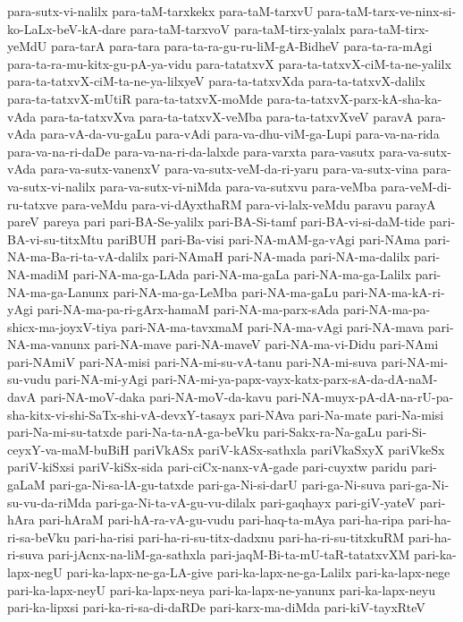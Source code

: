 {para-sutx-vi-nalilx
para-taM-tarxkekx
para-taM-tarxvU
para-taM-tarx-ve-ninx-si-ko-LaLx-beV-kA-dare
para-taM-tarxvoV
para-taM-tirx-yalalx
para-taM-tirx-yeMdU
para-tarA
para-tara
para-ta-ra-gu-ru-liM-gA-BidheV
para-ta-ra-mAgi
para-ta-ra-mu-kitx-gu-pA-ya-vidu
para-tatatxvX
para-ta-tatxvX-ciM-ta-ne-yalilx
para-ta-tatxvX-ciM-ta-ne-ya-lilxyeV
para-ta-tatxvXda
para-ta-tatxvX-dalilx
para-ta-tatxvX-mUtiR
para-ta-tatxvX-moMde
para-ta-tatxvX-parx-kA-sha-ka-vAda
para-ta-tatxvXva
para-ta-tatxvX-veMba
para-ta-tatxvXveV
paravA
para-vAda
para-vA-da-vu-gaLu
para-vAdi
para-va-dhu-viM-ga-Lupi
para-va-na-rida
para-va-na-ri-daDe
para-va-na-ri-da-lalxde
para-varxta
para-vasutx
para-va-sutx-vAda
para-va-sutx-vanenxV
para-va-sutx-veM-da-ri-yaru
para-va-sutx-vina
para-va-sutx-vi-nalilx
para-va-sutx-vi-niMda
para-va-sutxvu
para-veMba
para-veM-di-ru-tatxve
para-veMdu
para-vi-dAyxthaRM
para-vi-lalx-veMdu
paravu
parayA
pareV
pareya
pari
pari-BA-Se-yalilx
pari-BA-Si-tamf
pari-BA-vi-si-daM-tide
pari-BA-vi-su-titxMtu
pariBUH
pari-Ba-visi
pari-NA-mAM-ga-vAgi
pari-NAma
pari-NA-ma-Ba-ri-ta-vA-dalilx
pari-NAmaH
pari-NA-mada
pari-NA-ma-dalilx
pari-NA-madiM
pari-NA-ma-ga-LAda
pari-NA-ma-gaLa
pari-NA-ma-ga-Lalilx
pari-NA-ma-ga-Lanunx
pari-NA-ma-ga-LeMba
pari-NA-ma-gaLu
pari-NA-ma-kA-ri-yAgi
pari-NA-ma-pa-ri-gArx-hamaM
pari-NA-ma-parx-sAda
pari-NA-ma-pa-shicx-ma-joyxV-tiya
pari-NA-ma-tavxmaM
pari-NA-ma-vAgi
pari-NA-mava
pari-NA-ma-vanunx
pari-NA-mave
pari-NA-maveV
pari-NA-ma-vi-Didu
pari-NAmi
pari-NAmiV
pari-NA-misi
pari-NA-mi-su-vA-tanu
pari-NA-mi-suva
pari-NA-mi-su-vudu
pari-NA-mi-yAgi
pari-NA-mi-ya-papx-vayx-katx-parx-sA-da-dA-naM-davA
pari-NA-moV-daka
pari-NA-moV-da-kavu
pari-NA-muyx-pA-dA-na-rU-pa-sha-kitx-vi-shi-SaTx-shi-vA-devxY-tasayx
pari-NAva
pari-Na-mate
pari-Na-misi
pari-Na-mi-su-tatxde
pari-Na-ta-nA-ga-beVku
pari-Sakx-ra-Na-gaLu
pari-Si-ceyxY-va-maM-buBiH
pariVkASx
pariV-kASx-sathxla
pariVkaSxyX
pariVkeSx
pariV-kiSxsi
pariV-kiSx-sida
pari-ciCx-nanx-vA-gade
pari-cuyxtw
paridu
pari-gaLaM
pari-ga-Ni-sa-lA-gu-tatxde
pari-ga-Ni-si-darU
pari-ga-Ni-suva
pari-ga-Ni-su-vu-da-riMda
pari-ga-Ni-ta-vA-gu-vu-dilalx
pari-gaqhayx
pari-giV-yateV
pari-hAra
pari-hAraM
pari-hA-ra-vA-gu-vudu
pari-haq-ta-mAya
pari-ha-ripa
pari-ha-ri-sa-beVku
pari-ha-risi
pari-ha-ri-su-titx-dadxnu
pari-ha-ri-su-titxkuRM
pari-ha-ri-suva
pari-jAcnx-na-liM-ga-sathxla
pari-jaqM-Bi-ta-mU-taR-tatatxvXM
pari-ka-lapx-negU
pari-ka-lapx-ne-ga-LA-give
pari-ka-lapx-ne-ga-Lalilx
pari-ka-lapx-nege
pari-ka-lapx-neyU
pari-ka-lapx-neya
pari-ka-lapx-ne-yanunx
pari-ka-lapx-neyu
pari-ka-lipxsi
pari-ka-ri-sa-di-daRDe
pari-karx-ma-diMda
pari-kiV-tayxRteV
}
